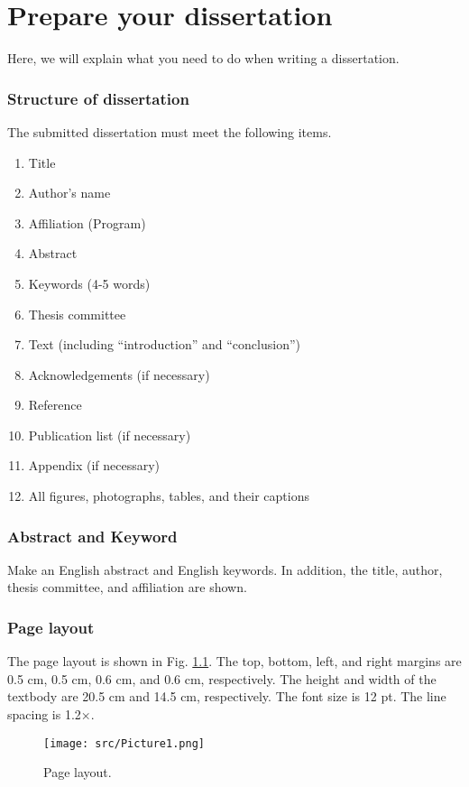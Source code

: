 \chapter{Prepare your dissertation}
Here, we will explain what you need to do when writing a dissertation.

\subsection{Structure of dissertation}
The submitted dissertation must meet the following items.

\begin{enumerate}
    \item Title
    \item Author's name
    \item Affiliation (Program)
    \item Abstract
    \item Keywords (4-5 words)
    \item Thesis committee
    \item Text (including ``introduction'' and ``conclusion'')
    \item Acknowledgements (if necessary)
    \item Reference
    \item Publication list (if necessary)
    \item Appendix (if necessary)
    \item All figures, photographs, tables, and their captions
\end{enumerate}

\subsection{Abstract and Keyword}

Make an English abstract and English keywords. In addition, the title, author, thesis committee, and aﬃliation are shown.

\subsection{Page layout}
The page layout is shown in Fig. \ref{fig:layout}.
The top, bottom, left, and right margins are
0.5 cm, 0.5 cm, 0.6 cm, and 0.6 cm, respectively.
The height and width of the textbody are 20.5 cm and 14.5 cm, respectively.
The font size is 12 pt. The line spacing is 1.2×.

\begin{figure}[t]
    \centering
    \texttt{[image: src/Picture1.png]}
    \caption{Page layout.}
    \label{fig:layout}
\end{figure}


